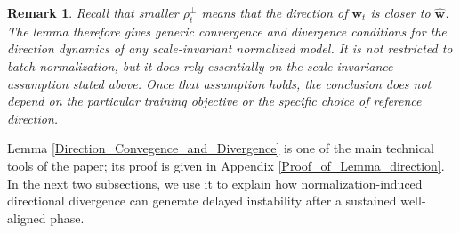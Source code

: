 \documentclass[pdflatex,sn-basic]{sn-jnl}%
\theoremstyle{thmstyleone}%
\newtheorem{remark}{Remark}%
\begin{document}
\begin{remark}
  Recall that smaller $\rho_t^{\perp}$ means that the direction of $\mathbf{w}_t$ is closer to $\hat{\mathbf{w}}$. The lemma therefore gives generic convergence and divergence conditions for the direction dynamics of any scale-invariant normalized model. It is not restricted to batch normalization, but it does rely essentially on the scale-invariance assumption stated above. Once that assumption holds, the conclusion does not depend on the particular training objective or the specific choice of reference direction. 
\end{remark}
Lemma \ref{Direction_Convegence_and_Divergence} is one of the main technical tools of the paper; its proof is given in Appendix \ref{Proof_of_Lemma_direction}. In the next two subsections, we use it to explain how normalization-induced directional divergence can generate delayed instability after a sustained well-aligned phase.
\end{document}
